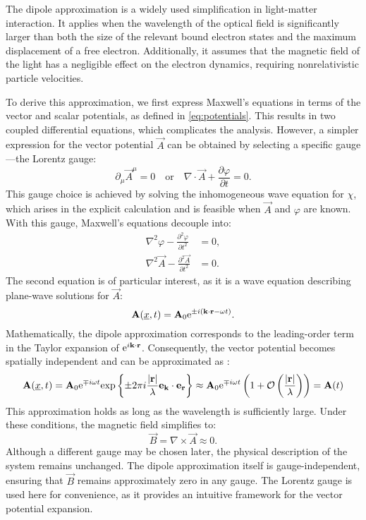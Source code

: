 The dipole approximation is a widely used simplification in light-matter interaction. 
It applies when the wavelength of the optical field is significantly larger than both the size of the relevant bound electron states and the maximum displacement of a free electron. 
Additionally, it assumes that the magnetic field of the light has a negligible effect on the electron dynamics, requiring nonrelativistic particle velocities.

To derive this approximation, we first express Maxwell’s equations in terms of the vector and scalar potentials, as defined in \eqref{eq:potentials}. 
This results in two coupled differential equations, which complicates the analysis. 
However, a simpler expression for the vector potential $\vec{A}$ can be obtained by selecting a specific gauge—the Lorentz gauge:
\begin{equation*}
    \partial_{\mu} \vec{A}^{\mu} = 0 \quad \text{or} \quad \nabla \cdot \vec{A} + \frac{\partial \varphi}{\partial t} = 0.
\end{equation*}
This gauge choice is achieved by solving the inhomogeneous wave equation for $\chi$, which arises in the explicit calculation and is feasible when $\vec{A}$ and $\varphi$ are known. With this gauge, Maxwell's equations decouple into:
\begin{equation*}
    \begin{aligned}
        \nabla^2 \varphi - \frac{\partial^2 \varphi}{\partial t^2} &= 0, \\
        \nabla^2 \vec{A} - \frac{\partial^2 \vec{A}}{\partial t^2} &= 0.
    \end{aligned}
\end{equation*}
The second equation is of particular interest, as it is a wave equation describing plane-wave solutions for $\vec{A}$:
\begin{equation*}
    \mathbf{A}(\underline{x}, t) = \mathbf{A}_0 \mathrm{e}^{\pm i (\mathbf{k} \cdot \mathbf{r} - \omega t)}.
\end{equation*}
Mathematically, the dipole approximation corresponds to the leading-order term in the Taylor expansion of $\mathrm{e}^{i\mathbf{k} \cdot \mathbf{r}}$. 
Consequently, the vector potential becomes spatially independent and can be approximated as \cite{bosmandipoleapprox}:
\begin{equation*}
    \mathbf{A}(\underline{x}, t) = \mathbf{A}_0\mathrm{e}^{\mp i \omega t}\mathrm{exp}\left\{\pm2\pi i\frac{|\mathbf{r}|}{\lambda}\mathbf{e}_{\mathbf{k}} \cdot \mathbf{e}_{\mathbf{r}}\right\} \approx \mathbf{A}_0 \mathrm{e}^{\mp i \omega t}\left(1+\mathcal{O}\left(\frac{|\mathbf{r}|}{\lambda}\right)\right) = \mathbf{A}(t)
\end{equation*}
This approximation holds as long as the wavelength is sufficiently large. 
Under these conditions, the magnetic field simplifies to:
\begin{equation*}
    \vec{B} = \nabla \times \vec{A} \approx 0.
\end{equation*}
Although a different gauge may be chosen later, the physical description of the system remains unchanged. 
The dipole approximation itself is gauge-independent, ensuring that $\vec{B}$ remains approximately zero in any gauge. 
The Lorentz gauge is used here for convenience, as it provides an intuitive framework for the vector potential expansion.

